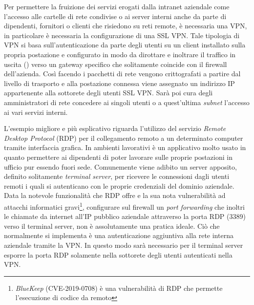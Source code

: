 \documentclass[target=bach,aauheader=]{thud}
\begin{document}
Per permettere la fruizione dei servizi erogati dalla intranet aziendale come l'accesso alle cartelle di rete condivise o ai server interni anche da parte di dipendenti, fornitori o clienti che risiedono su reti remote, è necessaria una VPN, in particolare è necessaria la configurazione di una SSL VPN. Tale tipologia di VPN si basa sull'autenticazione da parte degli utenti su un client installato sulla propria postazione e configurato in modo da dirottare e inoltrare il traffico in uscita () verso un gateway specifico che solitamente coincide con il firewall dell'azienda. Così facendo i pacchetti di rete vengono crittografati a partire dal livello di trasporto e alla postazione connessa viene assegnato un indirizzo IP appartenente alla sottorete degli utenti SSL VPN. Sarà poi cura degli amministratori di rete concedere ai singoli utenti o a quest'ultima \textit{subnet} l'accesso ai vari servizi interni. 

L'esempio migliore e più esplicativo riguarda l'utilizzo del servizio \textit{Remote Desktop Protocol} (RDP) per il collegamento remoto a un determinato computer tramite interfaccia grafica. In ambienti lavorativi è un applicativo molto usato in quanto permettere ai dipendenti di poter lavorare sulle proprie postazioni in ufficio pur essendo fuori sede. Comunemente viene adibito un server apposito, definito solitamente \textit{terminal server}, per ricevere le connessioni dagli utenti remoti i quali si autenticano con le proprie credenziali del dominio aziendale. Data la notevole funzionalità che RDP offre e la sua nota vulnerabilità ad attacchi informatici gravi\footnote{\textit{BlueKeep} (CVE-2019-0708) è una vulnerabilità di RDP che permette l'esecuzione di codice da remoto}, configurare sul firewall un \textit{port forwarding} che inoltri le chiamate da internet all'IP pubblico aziendale attraverso la porta RDP (3389) verso il terminal server, non è assolutamente una pratica ideale. Ciò che normalmente si implementa è una autenticazione aggiuntiva alla rete interna aziendale tramite la VPN. In questo modo sarà necessario per il terminal server esporre la porta RDP solamente nella sottorete degli utenti autenticati nella VPN.
\end{document}
